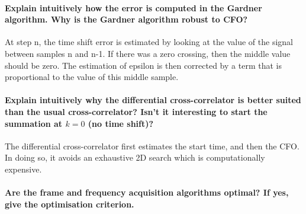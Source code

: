 \paragraph{Explain intuitively how the error is computed in the Gardner algorithm. Why is the
Gardner algorithm robust to CFO?} At step n, the time shift error is estimated by looking at the value of the signal between samples n and n-1. If there was a zero crossing, then the middle value should be zero. The estimation of epsilon is then corrected by a term that is proportional to the value of this middle sample.

\paragraph{Explain intuitively why the differential cross-correlator is better suited than the usual cross-correlator? Isn’t it interesting to start the summation at $k = 0$ (no time shift)?}
The differential cross-correlator first estimates the start time, and then the CFO. In doing so, it avoids an exhaustive 2D search which is computationally expensive.

\paragraph{Are the frame and frequency acquisition algorithms optimal? If yes, give the optimisation criterion.}
